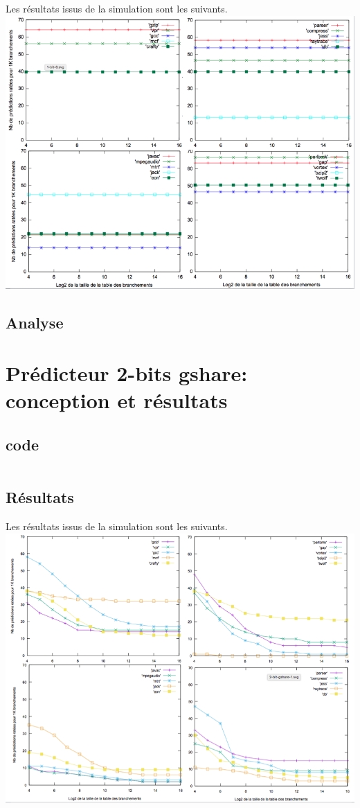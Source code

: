 \documentclass[a4paper]{article}
\begin{document}
Les résultats issus de la simulation sont les suivants.
\includegraphics[width=\linewidth]{2-bit-hist.png}

\subsection{Analyse}

\section{Prédicteur 2-bits gshare: conception et résultats}
\subsection{code}

\small
\begin{verbatim}
\end{verbatim}
\normalsize

\subsection{Résultats}

Les résultats issus de la simulation sont les suivants.
\includegraphics[width=\linewidth]{2-bit-gshare.png}
\end{document}
